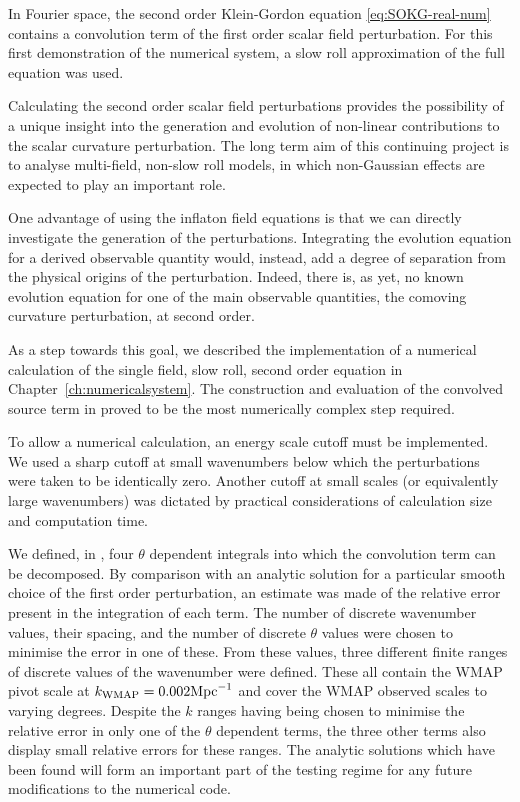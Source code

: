 In Fourier space, the second order Klein-Gordon equation \eqref{eq:SOKG-real-num} contains a
convolution term of the first order scalar field perturbation. For this first
demonstration of the numerical system, a slow roll approximation of the full
equation was used. 

Calculating the second order scalar field perturbations provides the possibility of
a unique insight into the generation and evolution of non-linear contributions to
the scalar curvature perturbation. The long term aim of this continuing project is
to analyse multi-field, non-slow roll models, in which non-Gaussian effects are
expected to play an important role.

One advantage of using the inflaton field equations is that we can directly
investigate the generation of the perturbations. Integrating the evolution
equation for a derived observable quantity would, instead, add a degree of
separation from the physical origins of the perturbation. Indeed, there is, as yet,
no known evolution equation for one of the main observable quantities, the comoving
curvature perturbation, at second order. 


As a step towards this goal, we described the implementation of a numerical
calculation of the single field, slow roll, second order equation in
Chapter~\ref{ch:numericalsystem}. The construction and evaluation of the convolved
source term in  proved to be the most numerically complex
step required. 

To allow a numerical calculation, an energy scale cutoff must be implemented. We used
a sharp cutoff at small wavenumbers below which the perturbations were taken to be
identically zero. Another cutoff at small scales (or equivalently large wavenumbers) was dictated
by practical considerations of calculation size and computation time. 

We defined, in , four $\theta$ dependent integrals
into which the convolution term can be decomposed. By comparison with an analytic
solution for a particular smooth choice of the first order perturbation, an estimate
was made of the relative error present in the integration of each term. The
number of discrete wavenumber values, their spacing, and the number of discrete
$\theta$ values were chosen to minimise the error in one of these. From these values, three
different finite ranges of discrete values of the wavenumber were defined.
These all contain the WMAP pivot scale at $k_\mathrm{WMAP}=0.002\mathrm{Mpc}^{-1}$ and cover the
WMAP observed scales to varying degrees.
% 
Despite the $k$ ranges having being chosen to minimise the relative error in only
one of the $\theta$ dependent terms, the three other terms also display
small relative errors for these ranges. 
% 
The analytic solutions which have been found will form  an
important part of the testing regime for any future modifications to the numerical
code. 



